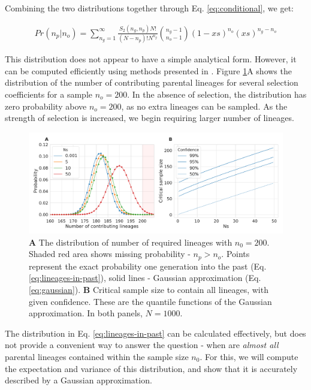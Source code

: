 \documentclass[review]{elsarticle}
\begin{document}
Combining the two distributions together through Eq. \ref{eq:conditional}, we get:

\begin{align}
  \label{eq:lineages-in-past}
   Pr(n_p|n_o) = \sum_{n_g=1}^{\infty} \frac{S_2(n_g,n_p) N!}{(N-n_p)! N^{n_g}} \binom{n_g-1}{n_o-1}(1-xs)^{n_o}(xs)^{n_g-n_o}
\end{align}

This distribution does not appear to have a simple analytical form. However, it can be computed
efficiently using methods presented in \citep{ONeill2019}. Figure \ref{fig:combined}A shows the
distribution of the number of contributing parental lineages for several selection coefficients for
a sample $n_o=200$. In the absence of selection, the distribution has zero probability above $n_o=200$,
as no extra lineages can be sampled. As the strength of selection is increased, we begin requiring
larger number of lineages.

\begin{figure}
  \centering
  \includegraphics[width=\textwidth]{fig/combined.pdf}
  \caption{\textbf{A} The distribution of number of required lineages with $n_0=200$. Shaded red
    area shows missing probability - $n_p > n_o$. Points represent the exact probability one
    generation into the past (Eq. \ref{eq:lineages-in-past}), solid lines - Gaussian approximation
    (Eq. \ref{eq:gaussian}). \textbf{B} Critical sample size to contain all lineages, with given
    confidence. These are the quantile functions of the Gaussian approximation. In both panels,
    $N=1000$.}
  \label{fig:combined}
\end{figure}

The distribution in Eq. \ref{eq:lineages-in-past} can be calculated effectively, but does not
provide a convenient way to answer the question - when are \textit{almost all} parental lineages
contained within the sample size $n_0$. For this, we will compute the expectation and variance 
of this distribution, and show that it is accurately described by a Gaussian approximation.
\end{document}
